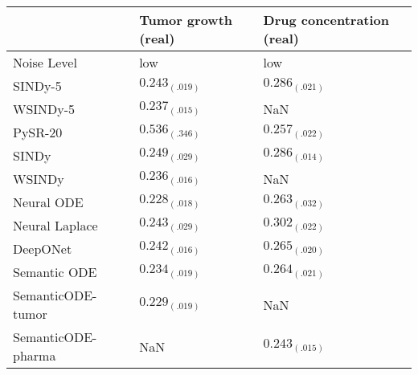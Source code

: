 \begin{tabular}{lll}
\toprule
 & Tumor growth (real) & Drug concentration (real) \\
\midrule
Noise Level & low & low \\
SINDy-5 & $0.243_{(.019)}$ & $0.286_{(.021)}$ \\
WSINDy-5 & $0.237_{(.015)}$ & NaN \\
PySR-20 & $0.536_{(.346)}$ & $0.257_{(.022)}$ \\
SINDy & $0.249_{(.029)}$ & $0.286_{(.014)}$ \\
WSINDy & $0.236_{(.016)}$ & NaN \\
Neural ODE & $0.228_{(.018)}$ & $0.263_{(.032)}$ \\
Neural Laplace & $0.243_{(.029)}$ & $0.302_{(.022)}$ \\
DeepONet & $0.242_{(.016)}$ & $0.265_{(.020)}$ \\
Semantic ODE & $0.234_{(.019)}$ & $0.264_{(.021)}$ \\
SemanticODE-tumor & $0.229_{(.019)}$ & NaN \\
SemanticODE-pharma & NaN & $0.243_{(.015)}$ \\
\bottomrule
\end{tabular}
